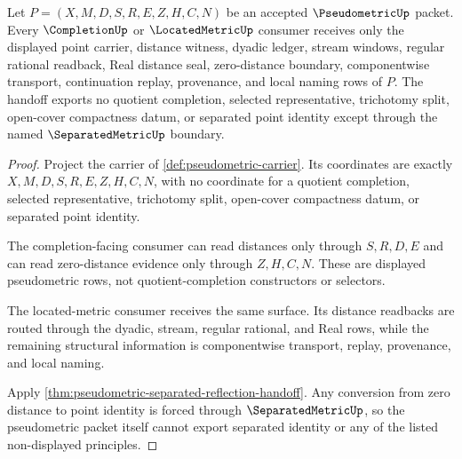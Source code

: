 \begin{theorem}
\label{thm:pseudometric-completion-nonescape-obligation}
Let $P=(X,M,D,S,R,E,Z,H,C,N)$ be an accepted $\PseudometricUp$ packet. Every $\CompletionUp$ or $\LocatedMetricUp$ consumer receives only the displayed point carrier, distance witness, dyadic ledger, stream windows, regular rational readback, Real distance seal, zero-distance boundary, componentwise transport, continuation replay, provenance, and local naming rows of $P$. The handoff exports no quotient completion, selected representative, trichotomy split, open-cover compactness datum, or separated point identity except through the named $\SeparatedMetricUp$ boundary.
\end{theorem}
\begin{proof}
Project the carrier of \autoref{def:pseudometric-carrier}. Its coordinates are exactly $X,M,D,S,R,E,Z,H,C,N$, with no coordinate for a quotient completion, selected representative, trichotomy split, open-cover compactness datum, or separated point identity.

The completion-facing consumer can read distances only through $S,R,D,E$ and can read zero-distance evidence only through $Z,H,C,N$. These are displayed pseudometric rows, not quotient-completion constructors or selectors.

The located-metric consumer receives the same surface. Its distance readbacks are routed through the dyadic, stream, regular rational, and Real rows, while the remaining structural information is componentwise transport, replay, provenance, and local naming.

Apply \autoref{thm:pseudometric-separated-reflection-handoff}. Any conversion from zero distance to point identity is forced through $\SeparatedMetricUp$, so the pseudometric packet itself cannot export separated identity or any of the listed non-displayed principles.
\end{proof}

